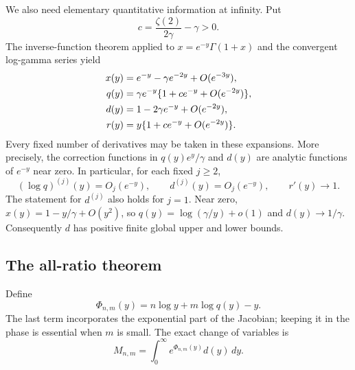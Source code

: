 \documentclass[11pt,letterpaper]{article}
\theoremstyle{definition}
\theoremstyle{remark}
\begin{document}
We also need elementary quantitative information at infinity. Put
\[
 c=\frac{\zeta(2)}{2\gamma}-\gamma>0.
\]
The inverse-function theorem applied to
$x=e^{-y}\Gamma(1+x)$ and the convergent log-gamma series yield
\begin{align}
 x(y)&=e^{-y}-\gamma e^{-2y}+O(e^{-3y}),\notag\\
 q(y)&=\gamma e^{-y}\{1+c e^{-y}+O(e^{-2y})\},\label{eq:inverse-infinity}\\
 d(y)&=1-2\gamma e^{-y}+O(e^{-2y}),\notag\\
 r(y)&=y\{1+c e^{-y}+O(e^{-2y})\}.\notag
\end{align}
Every fixed number of derivatives may be taken in these expansions.
More precisely, the correction functions in $q(y)e^y/\gamma$ and
$d(y)$ are analytic functions of $e^{-y}$ near zero. In particular,
for each fixed $j\ge2$,
\begin{equation}\label{eq:derivative-bounds}
 (\log q)^{(j)}(y)=O_j(e^{-y}),\qquad
 d^{(j)}(y)=O_j(e^{-y}),\qquad r'(y)\longrightarrow1.
\end{equation}
The statement for $d^{(j)}$ also holds for $j=1$.
Near zero, $x(y)=1-y/\gamma+O(y^2)$, so
$q(y)=\log(\gamma/y)+o(1)$ and $d(y)\to1/\gamma$.
Consequently $d$ has positive finite global upper and lower bounds.

\subsection{The all-ratio theorem}

Define
\begin{equation}\label{eq:uniform-phase}
 \Phi_{n,m}(y)=n\log y+m\log q(y)-y.
\end{equation}
The last term incorporates the exponential part of the Jacobian; keeping
it in the phase is essential when $m$ is small. The exact change of
variables is
\begin{equation}\label{eq:exact-y-moment}
 M_{n,m}=\int_0^\infty e^{\Phi_{n,m}(y)}d(y)\,dy.
\end{equation}
\end{document}
